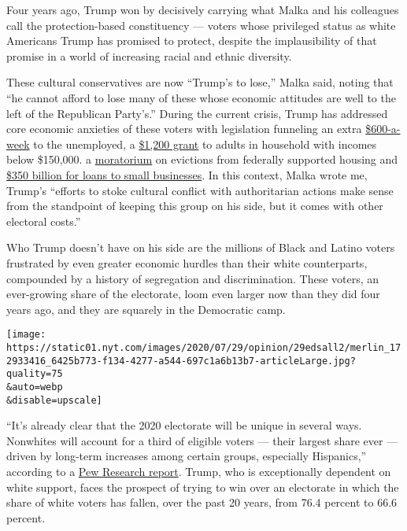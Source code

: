 Four years ago, Trump won by decisively carrying what Malka and his
colleagues call the protection-based constituency --- voters whose
privileged status as white Americans Trump has promised to protect,
despite the implausibility of that promise in a world of increasing
racial and ethnic diversity.

These cultural conservatives are now ``Trump's to lose,'' Malka said,
noting that ``he cannot afford to lose many of these whose economic
attitudes are well to the left of the Republican Party's.'' During the
current crisis, Trump has addressed core economic anxieties of these
voters with legislation funneling an extra
\href{https://fortune.com/2020/07/27/unemployment-600-extra-benefits-extension-cut-republican-plan-stimulus-package-bill-200-per-week-how-much-update/}{\$600-a-week}
to the unemployed, a
\href{https://www.marketplace.org/2020/03/19/white-house-may-send-out-1000-checks-to-adults-500-to-children/}{\$1,200
grant} to adults in household with incomes below \$150,000. a
\href{https://nlihc.org/federal-moratoriums}{moratorium} on evictions
from federally supported housing and
\href{https://smallbusiness.house.gov/uploadedfiles/cares_flow_chart_edit.pdf}{\$350
billion for loans to small businesses}. In this context, Malka wrote me,
Trump's ``efforts to stoke cultural conflict with authoritarian actions
make sense from the standpoint of keeping this group on his side, but it
comes with other electoral costs.''

Who Trump doesn't have on his side are the millions of Black and Latino
voters frustrated by even greater economic hurdles than their white
counterparts, compounded by a history of segregation and discrimination.
These voters, an ever-growing share of the electorate, loom even larger
now than they did four years ago, and they are squarely in the
Democratic camp.

\texttt{[image: https://static01.nyt.com/images/2020/07/29/opinion/29edsall2/merlin\_172933416\_6425b773-f134-4277-a544-697c1a6b13b7-articleLarge.jpg?quality=75\\\&auto=webp\\\&disable=upscale]}

``It's already clear that the 2020 electorate will be unique in several
ways. Nonwhites will account for a third of eligible voters --- their
largest share ever --- driven by long-term increases among certain
groups, especially Hispanics,'' according to a
\href{https://www.pewsocialtrends.org/essay/an-early-look-at-the-2020-electorate/}{Pew
Research report}. Trump, who is exceptionally dependent on white
support, faces the prospect of trying to win over an electorate in which
the share of white voters has fallen, over the past 20 years, from 76.4
percent to 66.6 percent.

